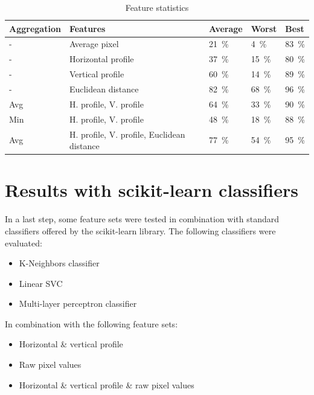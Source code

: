\documentclass[a4paper]{scrreprt}
\begin{document}
\begin{table}
		\begin{tabular}{lllll}
				\toprule
				Aggregation & Features & Average & Worst & Best \\
				\midrule
				- & Average pixel & \SI{21}{\percent} & \SI{4}{\percent} & \SI{83}{\percent} \\
				- & Horizontal profile & \SI{37}{\percent} & \SI{15}{\percent} & \SI{80}{\percent} \\
				- & Vertical profile & \SI{60}{\percent} & \SI{14}{\percent} & \SI{89}{\percent} \\
				- & Euclidean distance & \SI{82}{\percent} & \SI{68}{\percent} & \SI{96}{\percent} \\
				Avg & H. profile, V. profile & \SI{64}{\percent} & \SI{33}{\percent} & \SI{90}{\percent} \\
				Min & H. profile, V. profile & \SI{48}{\percent} & \SI{18}{\percent} & \SI{88}{\percent} \\
				Avg & H. profile, V. profile, Euclidean distance & \SI{77}{\percent} & \SI{54}{\percent} & \SI{95}{\percent} \\
				\bottomrule
		\end{tabular}
		\label{tbl:evaluation}
		\caption{Feature statistics}
\end{table}

\section{Results with scikit-learn classifiers}

In a last step, some feature sets were tested in combination with standard
classifiers offered by the scikit-learn library. The following classifiers were
evaluated:

\begin{itemize}
		\item K-Neighbors classifier
		\item Linear SVC
		\item Multi-layer perceptron classifier
\end{itemize}

In combination with the following feature sets:

\begin{itemize}
		\item Horizontal \& vertical profile
		\item Raw pixel values
		\item Horizontal \& vertical profile \& raw pixel values
\end{itemize}
\end{document}
